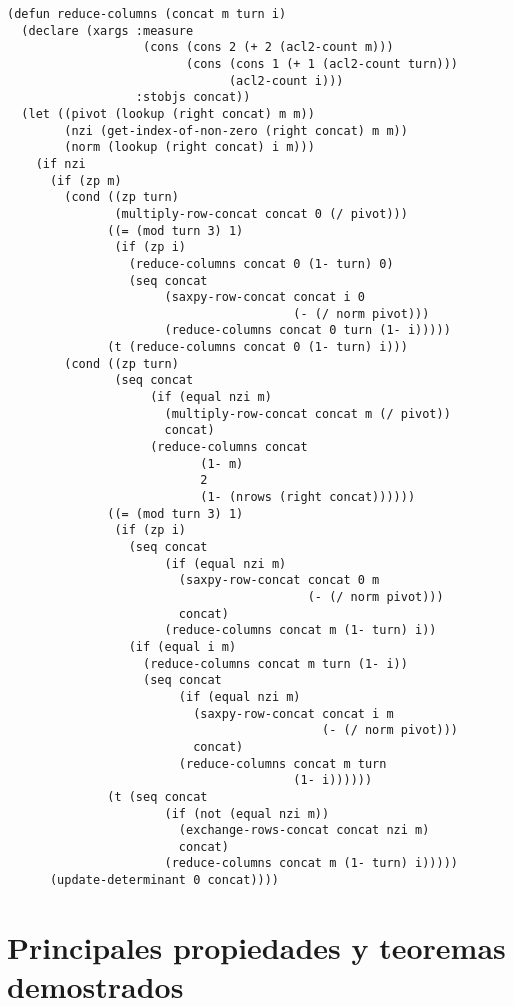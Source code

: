 \documentclass[a4paper,10pt]{article}
\begin{document}
\newpage	
\begin{lstlisting}[language=clips]
(defun reduce-columns (concat m turn i)
  (declare (xargs :measure 
                   (cons (cons 2 (+ 2 (acl2-count m))) 
                         (cons (cons 1 (+ 1 (acl2-count turn))) 
                               (acl2-count i))) 
                  :stobjs concat))
  (let ((pivot (lookup (right concat) m m))
        (nzi (get-index-of-non-zero (right concat) m m))
        (norm (lookup (right concat) i m)))
    (if nzi
      (if (zp m)
        (cond ((zp turn)
               (multiply-row-concat concat 0 (/ pivot)))
              ((= (mod turn 3) 1)
               (if (zp i)
                 (reduce-columns concat 0 (1- turn) 0)
                 (seq concat
                      (saxpy-row-concat concat i 0 
                                        (- (/ norm pivot)))
                      (reduce-columns concat 0 turn (1- i)))))
              (t (reduce-columns concat 0 (1- turn) i)))
        (cond ((zp turn)
               (seq concat
                    (if (equal nzi m)
                      (multiply-row-concat concat m (/ pivot))
                      concat)
                    (reduce-columns concat 
                           (1- m) 
                           2 
                           (1- (nrows (right concat))))))
              ((= (mod turn 3) 1)
               (if (zp i)
                 (seq concat
                      (if (equal nzi m)
                        (saxpy-row-concat concat 0 m 
                                          (- (/ norm pivot))) 
                        concat)
                      (reduce-columns concat m (1- turn) i))
                 (if (equal i m)
                   (reduce-columns concat m turn (1- i))
                   (seq concat
                        (if (equal nzi m)
                          (saxpy-row-concat concat i m 
                                            (- (/ norm pivot)))
                          concat)
                        (reduce-columns concat m turn 
                                        (1- i))))))
              (t (seq concat
                      (if (not (equal nzi m))
                        (exchange-rows-concat concat nzi m)
                        concat)
                      (reduce-columns concat m (1- turn) i)))))
      (update-determinant 0 concat))))
\end{lstlisting}

\newpage
\vspace{24pt}
\section{Principales propiedades y teoremas demostrados}
\end{document}
